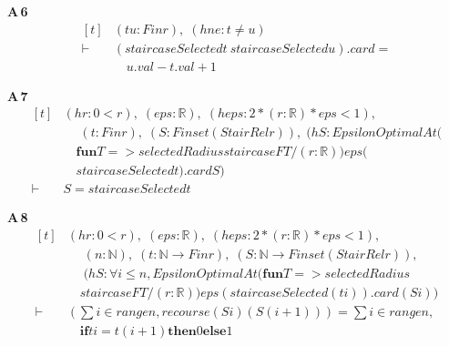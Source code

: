 \noindent\textbf{A\,6}\quad{}
{\footnotesize\[ \begin{aligned}[t]
&(\mathit{t} \mathit{u} : \mathit{Fin} \mathit{r}),\; (\mathit{hne} : \mathit{t} \neq \mathit{u})\\
\vdash\;&(\mathit{staircaseSelected} \mathit{t} \ \mathit{staircaseSelected} \mathit{u}).\mathit{card} =\\
&\quad \mathit{u}.\mathit{val}-\mathit{t}.\mathit{val}+1
\end{aligned} \]}

\noindent\textbf{A\,7}\quad{}
{\footnotesize\[ \begin{aligned}[t]
&(\mathit{hr} : 0 < \mathit{r}),\; (\mathit{eps} : \mathbb{R} ),\; (\mathit{heps} : 2*(\mathit{r}:\mathbb{R} )*\mathit{eps} < 1),\\
&\quad \; (\mathit{t} : \mathit{Fin} \mathit{r}),\; (\mathit{S} : \mathit{Finset} (\mathit{StairRel} \mathit{r})),\; (\mathit{hS} : \mathit{EpsilonOptimalAt} (\\
&\quad \mathbf{fun} \mathit{T} => \mathit{selectedRadius} \mathit{staircaseF} \mathit{T}/(\mathit{r}:\mathbb{R} )) \mathit{eps} (\\
&\quad \mathit{staircaseSelected} \mathit{t}).\mathit{card} \mathit{S})\\
\vdash\;&\mathit{S}=\mathit{staircaseSelected} \mathit{t}
\end{aligned} \]}

\noindent\textbf{A\,8}\quad{}
{\footnotesize\[ \begin{aligned}[t]
&(\mathit{hr} : 0 < \mathit{r}),\; (\mathit{eps} : \mathbb{R} ),\; (\mathit{heps} : 2*(\mathit{r}:\mathbb{R} )*\mathit{eps} < 1),\\
&\quad \; (\mathit{n} : \mathbb{N} ),\; (\mathit{t} : \mathbb{N} \to \mathit{Fin} \mathit{r}),\; (\mathit{S} : \mathbb{N} \to \mathit{Finset} (\mathit{StairRel} \mathit{r})),\\
&\quad \; (\mathit{hS} : \forall \mathit{i} \leq \mathit{n},\mathit{EpsilonOptimalAt} (\mathbf{fun} \mathit{T} => \mathit{selectedRadius}\\
&\quad \mathit{staircaseF} \mathit{T}/(\mathit{r}:\mathbb{R} )) \mathit{eps} (\mathit{staircaseSelected} (\mathit{t} \mathit{i})).\mathit{card} (\mathit{S} \mathit{i}))\\
\vdash\;&(\textstyle\sum \mathit{i} \in \mathit{range} \mathit{n},\mathit{recourse} (\mathit{S} \mathit{i}) (\mathit{S} (\mathit{i}+1))) = \textstyle\sum \mathit{i} \in \mathit{range} \mathit{n},\\
&\quad \mathbf{if} \mathit{t} \mathit{i}=\mathit{t} (\mathit{i}+1) \mathbf{then} 0 \mathbf{else} 1
\end{aligned} \]}

